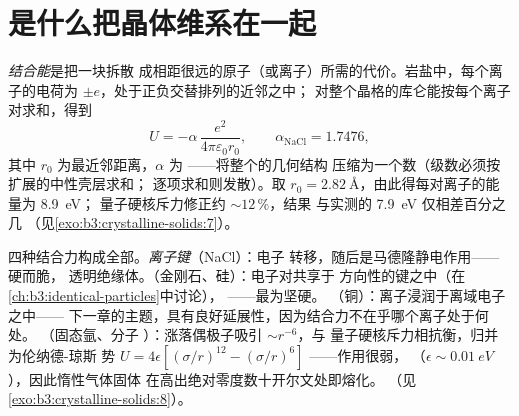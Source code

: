 \section{是什么把晶体维系在一起}

\begin{proposition}\label{prop:b3:crystalline-solids:madelung}
\emph{结合能}是把一块拆散
成相距很远的原子（或离子）所需的代价。岩盐中，每个离子的电荷为
$\pm e$，处于正负交替排列的近邻之中；
对整个晶格的库仑能按每个离子对求和，得到
\[
U = -\alpha\,\frac{e^2}{4\pi\varepsilon_0 r_0} ,
\qquad \alpha_{\text{NaCl}} = 1.7476 ,
\]
其中 $r_0$ 为最近邻距离，$\alpha$ 为
\emph{}——将整个的几何结构
压缩为一个数（级数必须按扩展的中性壳层求和；
逐项求和则发散）。取 $r_0 =
\qty{2.82}{\angstrom}$，由此得每对离子的能量为 \qty{8.9}{eV}；
量子硬核斥力修正约 $\sim12\,\%$，结果
与实测的 \qty{7.9}{eV} 仅相差百分之几
（见\cref{exo:b3:crystalline-solids:7}）。
\end{proposition}
\admitted

\begin{remark}[成键的四种方式]\label{rem:b3:crystalline-solids:bonds}
四种结合力构成全部。\emph{离子键}（NaCl）：电子
转移，随后是马德隆静电作用——硬而脆，
透明绝缘体。\emph{}（金刚石、硅）：电子对共享于
方向性的键之中（在\cref{ch:b3:identical-particles}中讨论），
——最为坚硬。
\emph{}（铜）：离子浸润于离域电子之中——
下一章的主题，具有良好延展性，因为结合力不在乎哪个离子处于何处。
\emph{}（固态氩、分子
）：涨落偶极子吸引 $\sim r^{-6}$，与
量子硬核斥力相抗衡，归并为伦纳德-琼斯
势 $U = 4\epsilon[(\sigma/r)^{12} - (\sigma/r)^6]$ ——作用很弱，
（$\epsilon \sim \qty{0.01}{eV}$），因此惰性气体固体
在高出绝对零度数十开尔文处即熔化。
（见\cref{exo:b3:crystalline-solids:8}）。
\end{remark}

